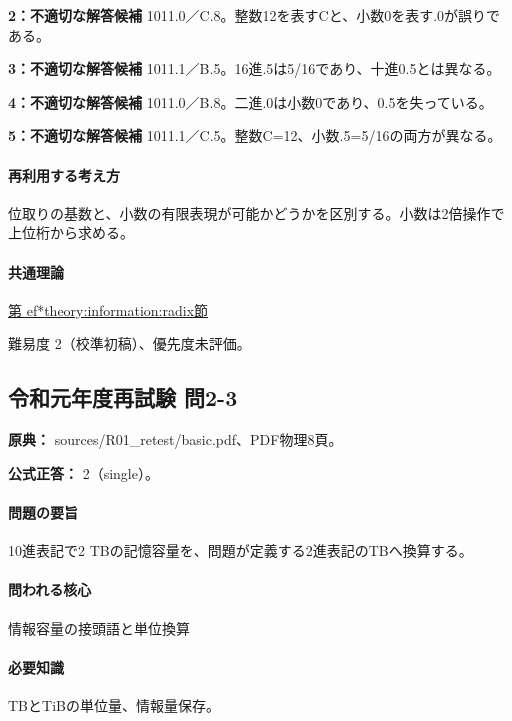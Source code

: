 \noindent\textbf{2：不適切な解答候補} 1011.0／C.8。整数12を表すCと、小数0を表す.0が誤りである。\par

\noindent\textbf{3：不適切な解答候補} 1011.1／B.5。16進.5は5/16であり、十進0.5とは異なる。\par

\noindent\textbf{4：不適切な解答候補} 1011.0／B.8。二進.0は小数0であり、0.5を失っている。\par

\noindent\textbf{5：不適切な解答候補} 1011.1／C.5。整数C=12、小数.5=5/16の両方が異なる。\par

\paragraph{再利用する考え方} 位取りの基数と、小数の有限表現が可能かどうかを区別する。小数は2倍操作で上位桁から求める。

\paragraph{共通理論} \hyperref[theory:information:radix]{第
ef*{theory:information:radix}節}

\par 難易度 2（校準初稿）、優先度未評価。

\subsection{令和元年度再試験 問2-3}
\label{q:r01-ret-basic-2-3}

\noindent\textbf{原典：} sources/R01\_retest/basic.pdf、PDF物理8頁。

\textbf{公式正答：} 2（single）。

\paragraph{問題の要旨} 10進表記で2 TBの記憶容量を、問題が定義する2進表記のTBへ換算する。

\paragraph{問われる核心} 情報容量の接頭語と単位換算

\paragraph{必要知識} TBとTiBの単位量、情報量保存。

